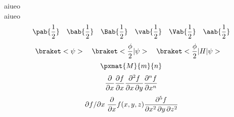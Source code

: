 \documentclass[paper=a4paper]{jlreq}
\begin{document}
aiueo\cite{Hemingway1952}\\
aiueo\\
\[
    \pab{\frac{1}{2}}    \quad %
    \bab{\frac{1}{2}}    \quad %
    \Bab{\frac{1}{2}}    \quad %
    \vab{\frac{1}{2}}    \quad %
    \Vab{\frac{1}{2}}    \quad %
    \aab{\frac{1}{2}}          %
\]
\[
    \braket< \psi >                           \quad
    \braket< \frac{\phi}{2} | \psi >          \quad
    \braket< \frac{\phi}{2} | H | \psi >      \quad
\]
\[
    \pxmat{M}{m}{n}
\]
\[
    \pdv{}{x}
    \pdv{f}{x}
    \pdv{f}{x, y}
    \pdv[order=n]{f}{x}
\]
\[
    \pdv{f}/{x}
    \pdv*{f(x,y,z)}{x}
    \pdv[order={2, 1, 2}]{f}{x, y, z}
\]

\\
\\
\printbibliography
\end{document}
